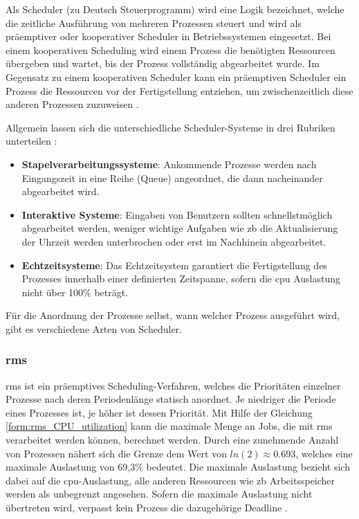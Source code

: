 \documentclass[../EDF Master Thesis.tex]{subfiles}
\begin{document}
Als Scheduler (zu Deutsch Steuerprogramm) wird eine Logik bezeichnet, welche die zeitliche Ausführung von mehreren Prozessen steuert und wird als präemptiver oder kooperativer Scheduler in Betriebssystemen eingesetzt.
Bei einem kooperativen Scheduling wird einem Prozess die benötigten Ressourcen übergeben und wartet, bis der Prozess vollständig abgearbeitet wurde.
Im Gegensatz zu einem kooperativen Scheduler kann ein präemptiven Scheduler ein Prozess die Ressourcen vor der Fertigstellung entziehen, um zwischenzeitlich diese anderen Prozessen zuzuweisen \parencite{wiki:003}.

Allgemein lassen sich die unterschiedliche Scheduler-Systeme in drei Rubriken unterteilen \parencite{wiki:007}:
\begin{itemize}
    \item \textbf{Stapelverarbeitungssysteme}: Ankommende Prozesse werden nach Eingangszeit in eine Reihe (Queue) angeordnet, die dann nacheinander abgearbeitet wird.
    \item \textbf{Interaktive Systeme}: Eingaben von Benutzern sollten schnellstmöglich abgearbeitet werden, weniger wichtige Aufgaben wie \ac{zb} die Aktualisierung der Uhrzeit werden unterbrochen oder erst im Nachhinein abgearbeitet.
    \item \textbf{Echtzeitsysteme}: Das Echtzeitsystem garantiert die Fertigstellung des Prozesses innerhalb einer definierten Zeitspanne, sofern die \ac{cpu} Auslastung nicht über 100\% beträgt.
\end{itemize}
Für die Anordnung der Prozesse selbst, wann welcher Prozess ausgeführt wird, gibt es verschiedene Arten von Scheduler.


\subsubsection{\acf{rms}} \label{section:rms}
    \ac{rms} ist ein präemptives Scheduling-Verfahren, welches die Prioritäten einzelner Prozesse nach deren Periodenlänge statisch anordnet.
    Je niedriger die Periode eines Prozesses ist, je höher ist dessen Priorität.
    Mit Hilfe der Gleichung \ref{form:rms_CPU_utilization} kann die maximale Menge an Jobs, die mit \ac{rms} verarbeitet werden können, berechnet werden.
    Durch eine zunehmende Anzahl von Prozessen nähert sich die Grenze dem Wert von $ln(2) \approx 0.693$, welches eine maximale Auslastung von 69,3\% bedeutet.
    Die maximale Auslastung bezieht sich dabei auf die \ac{cpu}-Auslastung, alle anderen Ressourcen wie \ac{zb} Arbeitsspeicher werden als unbegrenzt angesehen.
    Sofern die maximale Auslastung nicht übertreten wird, verpasst kein Prozess die dazugehörige Deadline \parencite{wiki:004}.
\end{document}
